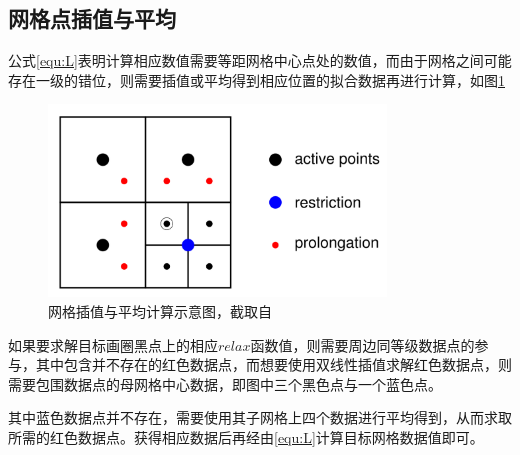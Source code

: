 \documentclass[lang=cn,11pt,a4paper]{elegantpaper}
\begin{document}
\subsection{网格点插值与平均}
公式\ref{equ:L}表明计算相应数值需要等距网格中心点处的数值，而由于网格之间可能存在一级的错位，则需要插值或平均得到相应位置的拟合数据再进行计算，如图\ref{fig:bili}
\begin{figure}[H]
        \centering
        \includegraphics[width = 0.8\textwidth]{bilinear.png}
        \caption{网格插值与平均计算示意图，截取自\cite{popinet2015quadtree}}
        \label{fig:bili}
\end{figure}
如果要求解目标画圈黑点上的相应$relax$函数值，则需要周边同等级数据点的参与，其中包含并不存在的红色数据点，而想要使用双线性插值求解红色数据点，则需要包围数据点的母网格中心数据，即图中三个黑色点与一个蓝色点。\par
其中蓝色数据点并不存在，需要使用其子网格上四个数据进行平均得到，从而求取所需的红色数据点。获得相应数据后再经由\ref{equ:L}计算目标网格数据值即可。
\printbibliography[heading=bibintoc, title=\ebibname]
\end{document}
